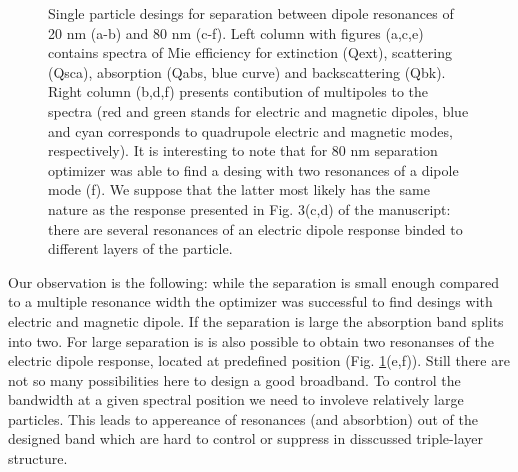 \documentclass[a4paper]{article}
\begin{document}
\begin{figure}
\begin{minipage}[h]{0.49\textwidth}
  \end{minipage}  
   \caption{Single particle desings for separation between dipole
     resonances of 20 nm (a-b) and 80 nm (c-f). Left column with
     figures (a,c,e) contains spectra of Mie efficiency for extinction
     (Qext), scattering (Qsca), absorption (Qabs, blue curve) and
     backscattering (Qbk). Right column (b,d,f) presents contibution
     of multipoles to the spectra (red and green stands for electric
     and magnetic dipoles, blue and cyan corresponds to quadrupole
     electric and magnetic modes, respectively). It is interesting to
     note that for 80 nm separation optimizer was able to find a
     desing with two resonances of a dipole mode (f). We suppose that
     the latter most likely has the same nature as the response
     presented in Fig. 3(c,d) of the manuscript: there are several
     resonances of an electric dipole response binded to different
     layers of the particle.\label{fig:broadband}}%
\end{figure}
Our observation is the following: while the separation is small enough
compared to a multiple resonance width the optimizer was successful to
find desings with electric and magnetic dipole. If the separation is
large the absorption band splits into two. For large separation is is
also possible to obtain two resonanses of the electric dipole
response, located at predefined position
(Fig. \ref{fig:broadband}(e,f)).  Still there are not so many
possibilities here to design a good broadband. To control the
bandwidth at a given spectral position we need to involeve relatively
large particles. This leads to appereance of resonances (and
absorbtion) out of the designed band which are hard to control or
suppress in disscussed triple-layer structure.
\end{document}
